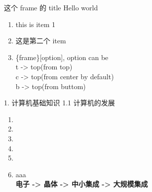\documentclass[aspectratio=169]{beamer}
\begin{document}
\begin{frame}[t]{这个 frame 的 title} \vspace{20pt}
Hello world
    \begin{enumerate}
        \item{this is item 1}
        \item{这是第二个 item}
        \item{\{frame\}[option], option can be  \\
             t -> top(from top)                 \\
             c -> top(from center by default)   \\
             b -> top(from buttom)              \\

        }
    \end{enumerate}

\end{frame}


\begin{frame}[t]{1. 计算机基础知识} \vspace{20pt}
    1.1 计算机的发展

    \begin{enumerate}
        \item{}
        \item{}
        \item{}
        \item{}
        \item{}
        \item{}
            aaa
        \\
\textbf{电子 -> 晶体 -> 中小集成 -> 大规模集成}

    \end{enumerate}

\end{frame}
\end{document}
